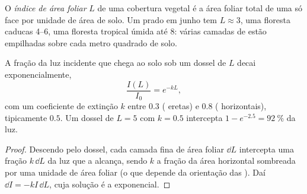 \begin{definition}\label{def:b1:flowering-plant-organization:lai}
O \emph{índice de área foliar} $L$ de uma
cobertura vegetal é a área foliar total de uma só face por unidade de
área de solo. Um prado em junho tem $L \approx 3$, uma floresta caducas
\qtyrange{4}{6}{}, uma floresta tropical úmida até \qty{8}{}: várias
camadas de  estão empilhadas sobre cada metro quadrado de solo.
\end{definition}

\begin{proposition}\label{prop:b1:flowering-plant-organization:beer}
A fração da luz incidente que chega ao solo sob um dossel de  $L$ decai exponencialmente,
\[
\frac{I(L)}{I_0} = e^{-kL},
\]
com um coeficiente de extinção $k$ entre $0.3$ ( eretas) e $0.8$
( horizontais), tipicamente $0.5$. Um dossel de $L = 5$ com
$k = 0.5$ intercepta $1 - e^{-2.5} = \qty{92}{\%}$ da luz.
\end{proposition}
\begin{proof}
Descendo pelo dossel, cada camada fina de área foliar $\dd L$ intercepta
uma fração $k\,\dd L$ da luz que a alcança, sendo $k$ a fração da área
horizontal sombreada por uma unidade de área foliar (o que depende da
orientação das ). Daí $\dd I = -kI\,\dd L$, cuja solução é a
exponencial.
\end{proof}

